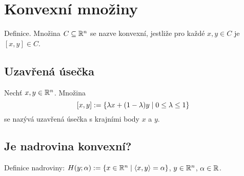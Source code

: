 

\newpage
\section*{Konvexní množiny} \label{sec:konvex}
Definice. Množina $C \subseteq \mathbb{R}^n$ se nazve konvexní, jestliže pro každé $x, y \in C$ je $[x,y] \in C$.

\subsection{Uzavřená úsečka}
Nechť $x, y \in \mathbb{R}^n$. Množina
\[ [x,y] := \left\lbrace \lambda x + (1-\lambda)y \mid 0 \leq \lambda \leq 1 \right\rbrace \]
se nazývá uzavřená úsečka s krajními body $x$ a $y$.

\subsection{Je nadrovina konvexní?}
Definice nadroviny: $H(y; \alpha) := \left\lbrace x \in \mathbb{R}^n \mid \langle x, y \rangle = \alpha \right\rbrace$, $y \in \mathbb{R}^n$, $\alpha \in \mathbb{R}$.

